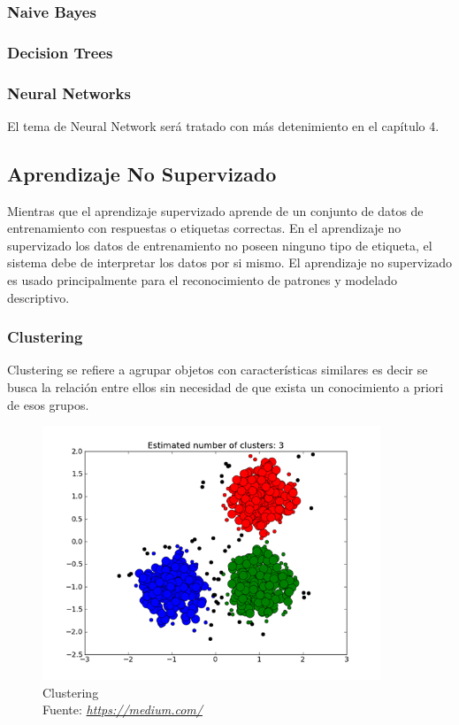 \subsubsection*{Naive Bayes}
\subsubsection*{Decision Trees}
\subsubsection*{Neural Networks}
El tema de Neural Network será tratado con más detenimiento en el capítulo 4.
\subsection*{Aprendizaje No Supervizado}
Mientras que el aprendizaje supervizado aprende  de un conjunto de datos de entrenamiento con respuestas o etiquetas correctas. En el aprendizaje no supervizado los datos de entrenamiento no poseen ninguno tipo de etiqueta, el sistema debe de interpretar los datos por si mismo.
El aprendizaje no supervizado es usado principalmente para el reconocimiento de patrones y modelado descriptivo.
\subsubsection*{Clustering}
Clustering se refiere a agrupar objetos con características similares es decir se busca la relación entre ellos sin necesidad de que exista un conocimiento a priori de esos grupos.
\begin{figure}[H]
	\centering
	\includegraphics[width=0.9\textwidth]{Figures/clustering.png}
	\caption{Clustering \\ Fuente:  \href{https://medium.com/deep-math-machine-learning-ai/different-types-of-machine-learning-and-their-types-34760b9128a2}{\textit{https://medium.com/}}}
	\label{Clustering}
\end{figure} 
